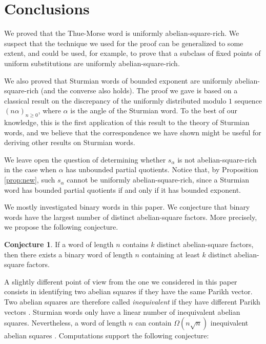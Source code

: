 \documentclass[11pt,reqno]{amsart}
\numberwithin{equation}{section}
\theoremstyle{plain}
\theoremstyle{definition}
\newtheorem{conjecture}[theorem]{Conjecture}
\theoremstyle{remark}
\begin{document}
\section{Conclusions}

We proved that the Thue-Morse word is uniformly abelian-square-rich. We suspect that the technique we used for the proof can be generalized to some extent, and could be used, for example,  to prove that a subclass of fixed points of uniform substitutions are uniformly abelian-square-rich.

We also proved that Sturmian words of bounded exponent are uniformly abelian-square-rich (and the converse also holds). The proof we gave is based on a classical result on the discrepancy of the uniformly distributed modulo $1$ sequence $(n\alpha)_{n\geq 0}$, where $\alpha$ is the angle of the Sturmian word. To the best of our knowledge, this is the first application of this result to the theory of Sturmian words, and we believe that the correspondence we have shown might be useful for deriving other results on Sturmian words.

We leave open the question of determining whether $s_{\alpha}$ is not abelian-square-rich in the case when $\alpha$ has unbounded partial quotients. Notice that, by Proposition \ref{prop:new}, such $s_{\alpha}$ cannot be uniformly abelian-square-rich, since a Sturmian word has bounded partial quotients if and only if it has bounded exponent.

We mostly investigated binary words in this paper. We conjecture that binary words have the largest number of distinct abelian-square factors. More precisely, we propose the following conjecture.

\begin{conjecture}
 If a word of length $n$ contains $k$ distinct abelian-square factors, then there exists a binary word of length $n$ containing at least $k$ distinct abelian-square factors.
\end{conjecture}

A slightly different point of view from the one we considered in this paper consists in identifying two abelian squares if they have the same Parikh vector. Two abelian squares are therefore called \emph{inequivalent} if they have different Parikh vectors \cite{FSP97}. Sturmian words only have a linear number of inequivalent abelian squares. Nevertheless, a word of length $n$ can contain $\Omega(n\sqrt{n})$ inequivalent abelian squares \cite{warsaw2}. Computations support the following conjecture:
\end{document}
